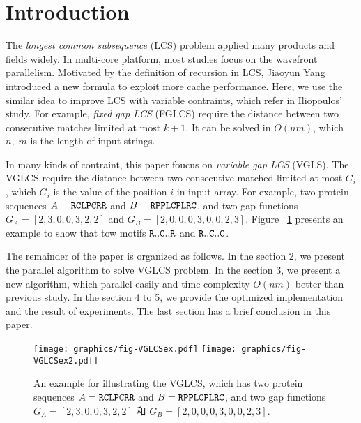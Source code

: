 \section{Introduction} %
\label{sec:Introduction}

The \emph{longest common subsequence} (LCS) problem applied many products and fields widely.  In multi-core platform, most studies focus on the wavefront parallelism. Motivated by the definition of recursion in LCS, Jiaoyun Yang introduced a new formula to exploit more cache performance.  Here, we use the similar idea to improve LCS with variable contraints, which refer in Iliopoulos' study.  For example, \emph{fixed gap LCS} (FGLCS) require the distance between two consecutive matches limited at most $k+1$.  It can be solved in $O(nm)$, which $n, \; m$ is the length of input strings.

In many kinds of contraint, this paper foucus on \emph{variable gap LCS} (VGLS). The VGLCS require the distance between two consecutive matched limited at most $G_i$, which $G_i$ is the value of the position $i$ in input array. For example, two protein sequences $A = \tt{RCLPCRR}$ and $B = \tt{RPPLCPLRC}$, and two gap functions $G_A = [2, 3, 0, 0, 3, 2, 2]$ and $G_B = [2, 0, 0, 0, 3, 0, 0, 2, 3]$. Figure ~\ref{fig:VGLCSex} presents an example to show that tow motifs $\tt{R..C..R}$ and $\tt{R..C..C}$.

The remainder of the paper is organized as follows. In the section 2, we present the parallel algorithm to solve VGLCS problem. In the section 3, we present a new algorithm, which parallel easily and time complexity $O(nm)$ better than previous study. In the section 4 to 5, we provide the optimized implementation and the result of experiments. The last section has a brief conclusion in this paper.

\begin{figure}[!thb]
  \centering
  \texttt{[image: graphics/fig-VGLCSex.pdf]}
  \texttt{[image: graphics/fig-VGLCSex2.pdf]}
  \caption{An example for illustrating the VGLCS, which has two protein sequences $A = \tt{RCLPCRR}$ and $B = \tt{RPPLCPLRC}$, and two gap functions $G_A = [2, 3, 0, 0, 3, 2, 2]$ 和 $G_B = [2, 0, 0, 0, 3, 0, 0, 2, 3]$.}
  \label{fig:VGLCSex}
\end{figure}